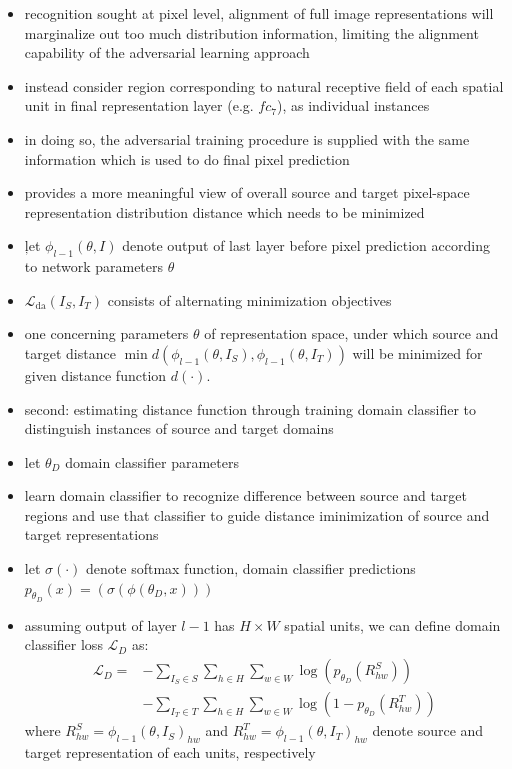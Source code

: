 \documentclass[]{article}
\begin{document}
\begin{itemize}
	\item recognition sought at pixel level, alignment of full image representations will marginalize out too much distribution information, limiting the alignment capability of the adversarial learning approach
	\item instead consider region corresponding to natural receptive field of each spatial unit in final representation layer (e.g. $fc_7$), as individual instances
	\item in doing so, the adversarial training procedure is supplied with the same information which is used to do final pixel prediction
	\item provides a more meaningful view of overall source and target pixel-space representation distribution distance which needs to be minimized
	\item ļet $\phi_{l-1}(\theta, I)$ denote output of last layer before pixel prediction according to network parameters $\theta$
	\item $\mathcal{L}_{\text{da}}(I_S, I_T)$ consists of alternating minimization objectives
	\item one concerning parameters $\theta$ of representation space, under which source and target distance $\min d(\phi_{l-1}(\theta, I_S), \phi_{l-1}(\theta, I_T))$ will be minimized for given distance function $d(\cdot)$.
	\item second: estimating distance function through training domain classifier to distinguish instances of source and target domains
	\item let $\theta_D$ domain classifier parameters
	\item learn domain classifier to recognize difference between source and target regions and use that classifier to guide distance iminimization of source and target representations
	\item let $\sigma (\cdot)$ denote softmax function, domain classifier predictions $p_{\theta_D}(x) = (\sigma(\phi(\theta_{D}, x)))$
	\item assuming output of layer $l-1$ has $H \times W$ spatial units, we can define domain classifier loss $\mathcal{L}_D$ as:
	\begin{align}
		\mathcal{L}_D = &- \sum_{I_S \in S} \sum_{h\in H}\sum_{w \in W} \log ( p_{\theta_D}(R^S_{hw}))\\
		&- \sum_{I_T \in T} \sum_{h\in H}\sum_{w \in W} \log (1 - p_{\theta_D}(R^T_{hw}))
	\end{align}
	where $R^S_{hw} = \phi_{l-1}(\theta, I_S)_{hw}$ and $R^T_{hw} = \phi_{l-1}(\theta, I_T)_{hw}$ denote source and target representation of each units, respectively

\end{itemize}
\end{document}
